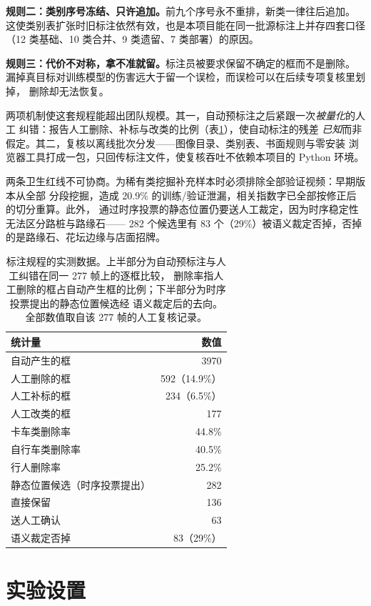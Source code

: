 \documentclass[11pt,a4paper]{ctexart}
\begin{document}
\textbf{规则二：类别序号冻结、只许追加。}前九个序号永不重排，新类一律往后追加。
这使类别表扩张时旧标注依然有效，也是本项目能在同一批源标注上并存四套口径
（12 类基础、10 类合并、9 类遗留、7 类部署）的原因。

\textbf{规则三：代价不对称，拿不准就留。}标注员被要求保留不确定的框而不是删除。
漏掉真目标对训练模型的伤害远大于留一个误检，而误检可以在后续专项复核里划掉，
删除却无法恢复。

两项机制使这套规程能超出团队规模。其一，自动预标注之后紧跟一次\emph{被量化}的人工
纠错：报告人工删除、补标与改类的比例（表\ref{tab:annot}），使自动标注的残差
\emph{已知}而非假定。其二，复核以离线批次分发——图像目录、类别表、书面规则与零安装
浏览器工具打成一包，只回传标注文件，使复核吞吐不依赖本项目的 Python 环境。

两条卫生红线不可协商。为稀有类挖掘补充样本时必须排除全部验证视频：早期版本从全部
分段挖掘，造成 20.9\% 的训练/验证泄漏，相关指数字已全部按修正后的切分重算。此外，
通过时序投票的静态位置仍要送人工裁定，因为时序稳定性无法区分路桩与路缘石——
282 个候选里有 83 个（29\%）被语义裁定否掉，否掉的是路缘石、花坛边缘与店面招牌。

\begin{table}[t]\centering\small
\caption{标注规程的实测数据。上半部分为自动预标注与人工纠错在同一 277 帧上的逐框比较，
删除率指人工删除的框占自动产生框的比例；下半部分为时序投票提出的静态位置候选经
语义裁定后的去向。全部数值取自该 277 帧的人工复核记录。}
\label{tab:annot}
\begin{tabular}{lr}
\toprule
统计量 & 数值 \\
\midrule
自动产生的框 & 3970 \\
人工删除的框 & 592（14.9\%） \\
人工补标的框 & 234（6.5\%） \\
人工改类的框 & 177 \\
\quad 卡车类删除率 & 44.8\% \\
\quad 自行车类删除率 & 40.5\% \\
\quad 行人删除率 & 25.2\% \\
\midrule
静态位置候选（时序投票提出） & 282 \\
直接保留 & 136 \\
送人工确认 & 63 \\
语义裁定否掉 & 83（29\%） \\
\bottomrule
\end{tabular}
\end{table}

\section{实验设置}
\label{sec:setup}
\end{document}

